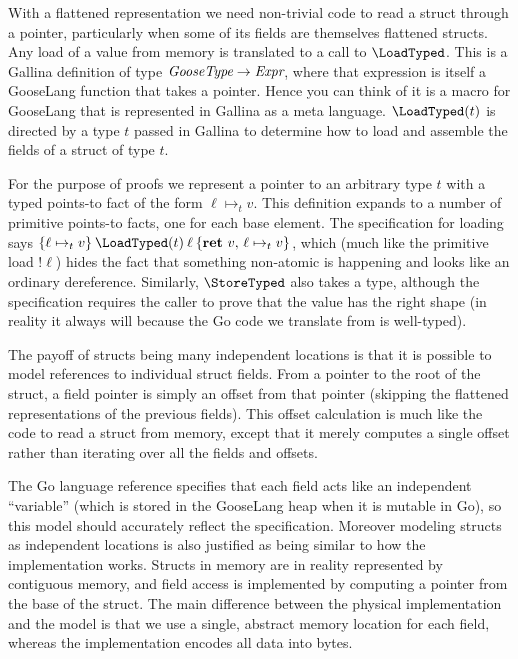 With a flattened representation we need non-trivial code to read a struct
through a pointer, particularly when some of its fields are themselves flattened
structs. Any load of a value from memory is translated to a call to
$\LoadTyped$. This is a Gallina definition of type
$\textit{GooseType} \to \textit{Expr}$, where that expression is itself a
GooseLang function that takes a pointer. Hence you can think of it is a macro
for GooseLang that is represented in Gallina as a meta language. $\LoadTyped(t)$
is directed by a type $t$ passed in Gallina to determine how to load and
assemble the fields of a struct of type $t$.

For the purpose of proofs we represent a pointer to an arbitrary type
$t$ with a typed points-to fact of the form $\ell \mapsto_t v$. This
definition expands to a number of primitive points-to facts, one for
each base element. The specification for loading says
$\hoare{\ell \mapsto_t v}{\LoadTyped(t) \app \ell}{\Ret{v} \ell \mapsto_t v}$, which
(much like the primitive load $!\ell$) hides the fact that something
non-atomic is happening and looks like an ordinary dereference.
Similarly, $\StoreTyped$ also takes a type, although the specification
requires the caller to prove that the value has the right shape (in
reality it always will because the Go code we translate from is
well-typed).

The payoff of structs being many independent locations is that it is
possible to model references to individual struct fields. From a pointer
to the root of the struct, a field pointer is simply an offset from that
pointer (skipping the flattened representations of the previous fields).
This offset calculation is much like the code to read a struct from
memory, except that it merely computes a single offset rather than
iterating over all the fields and offsets.

The Go language reference specifies that each field acts like an
independent ``variable'' (which is stored in the GooseLang heap when it
is mutable in Go), so this model should accurately reflect the
specification. Moreover modeling structs as independent locations is
also justified as being similar to how the implementation works. Structs
in memory are in reality represented by contiguous memory, and field
access is implemented by computing a pointer from the base of the
struct. The main difference between the physical implementation and the
model is that we use a single, abstract memory location for each field,
whereas the implementation encodes all data into bytes.

